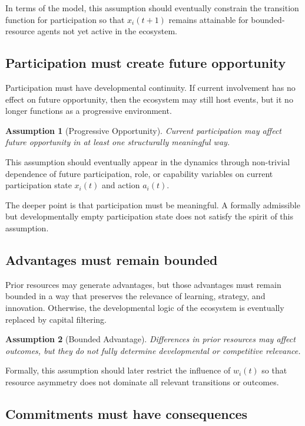 \documentclass[11pt]{article}
\newtheorem{assumption}{Assumption}
\begin{document}
In terms of the model, this assumption should eventually constrain the transition function for participation so that \(x_i(t+1)\) remains attainable for bounded-resource agents not yet active in the ecosystem.

\subsection{Participation must create future opportunity}

Participation must have developmental continuity. If current involvement has no effect on future opportunity, then the ecosystem may still host events, but it no longer functions as a progressive environment.

\begin{assumption}[Progressive Opportunity]
Current participation may affect future opportunity in at least one structurally meaningful way.
\end{assumption}

This assumption should eventually appear in the dynamics through non-trivial dependence of future participation, role, or capability variables on current participation state \(x_i(t)\) and action \(a_i(t)\).

The deeper point is that participation must be meaningful. A formally admissible but developmentally empty participation state does not satisfy the spirit of this assumption.

\subsection{Advantages must remain bounded}

Prior resources may generate advantages, but those advantages must remain bounded in a way that preserves the relevance of learning, strategy, and innovation. Otherwise, the developmental logic of the ecosystem is eventually replaced by capital filtering.

\begin{assumption}[Bounded Advantage]
Differences in prior resources may affect outcomes, but they do not fully determine developmental or competitive relevance.
\end{assumption}

Formally, this assumption should later restrict the influence of \(w_i(t)\) so that resource asymmetry does not dominate all relevant transitions or outcomes.

\subsection{Commitments must have consequences}
\end{document}
